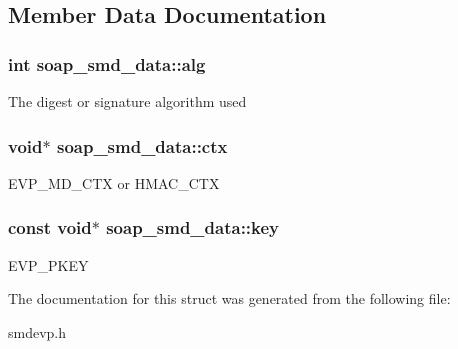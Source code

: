 \subsection{Member Data Documentation}
\hypertarget{structsoap__smd__data_a15caa8c87ff69d8910feb374dde9ebae}{
\subsubsection[{alg}]{\setlength{\rightskip}{0pt plus 5cm}int {\bf soap\_\-smd\_\-data::alg}}}
\label{structsoap__smd__data_a15caa8c87ff69d8910feb374dde9ebae}
The digest or signature algorithm used \hypertarget{structsoap__smd__data_a670571247f5bbe3c1ee0c56c797cab6a}{
\subsubsection[{ctx}]{\setlength{\rightskip}{0pt plus 5cm}void$\ast$ {\bf soap\_\-smd\_\-data::ctx}}}
\label{structsoap__smd__data_a670571247f5bbe3c1ee0c56c797cab6a}
EVP\_\-MD\_\-CTX or HMAC\_\-CTX \hypertarget{structsoap__smd__data_a6656967fef65051e2a8061829211016d}{
\subsubsection[{key}]{\setlength{\rightskip}{0pt plus 5cm}const void$\ast$ {\bf soap\_\-smd\_\-data::key}}}
\label{structsoap__smd__data_a6656967fef65051e2a8061829211016d}
EVP\_\-PKEY 

The documentation for this struct was generated from the following file:\begin{DoxyCompactItemize}
\item 
smdevp.h\end{DoxyCompactItemize}
